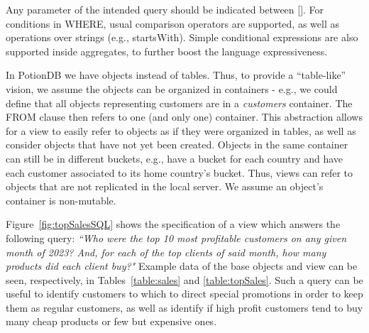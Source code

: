 \documentclass[sigconf, nonacm]{acmart}
\newcommand{\qcr}[1]{{\fontfamily{qcr}\selectfont #1}}
\newcommand{\carla}[1]{\nbnote{Carla}{green}{#1}}
\begin{document}
Any parameter of the intended query should be indicated between []. 
For conditions in \qcr{WHERE}, usual comparison operators are supported, as well as operations over strings (e.g., \qcr{startsWith}). %
Simple conditional expressions are also supported inside aggregates, to further boost the language expressiveness.	%

In PotionDB we have objects instead of tables.
Thus, to provide a ``table-like'' vision, we assume the objects can be organized in containers - e.g., we could define that all objects representing customers are in a \emph{customers} container.
The \qcr{FROM} clause then refers to one (and only one) container. %
This abstraction allows for a view to easily refer to objects as if they were organized in tables, as well as consider objects that have not yet been created.
Objects in the same container can still be in different buckets, e.g., have a bucket for each country and have each customer associated to its home country's bucket.
Thus, views can refer to objects that are not replicated in the local server.
We assume an object's container is non-mutable. %

Figure~\ref{fig:topSalesSQL} shows the specification of a view which answers the following query: \emph{``Who were the top 10 most profitable customers on any given month of 2023? And, for each of the top clients of said month, how many products did each client buy?"}
Example data of the base objects and view can be seen, respectively, in Tables~\ref{table:sales} and \ref{table:topSales}.
Such a query can be useful to identify customers to which to direct special promotions in order to keep them as regular customers, as well as identify if high profit customers tend to buy many cheap products or few but expensive ones.
\end{document}
